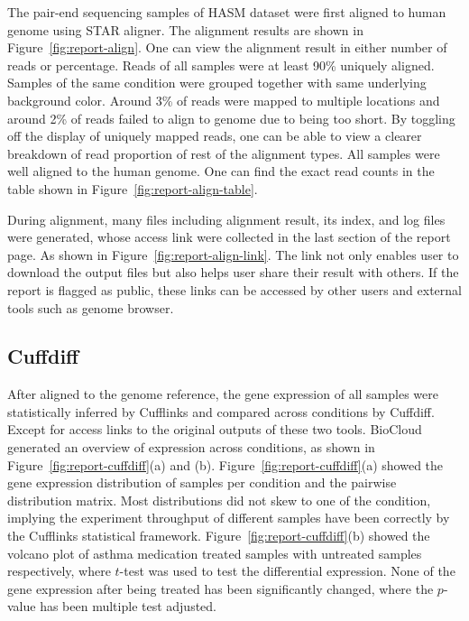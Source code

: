 

The pair-end sequencing samples of HASM dataset were first aligned to human
genome using STAR aligner. The alignment results are shown in
Figure~\ref{fig:report-align}. One can view the alignment result in either
number of reads or percentage. Reads of all samples were at least 90\% uniquely
aligned. Samples of the same condition were grouped together with same
underlying background color. Around 3\% of reads were mapped to multiple
locations and around 2\% of reads failed to align to genome due to being too
short. By toggling off the display of uniquely mapped reads, one can be able to
view a clearer breakdown of read proportion of rest of the alignment types.
All samples were well aligned to the human genome. One can find the exact read
counts in the table shown in Figure~\ref{fig:report-align-table}.



During alignment, many files including alignment result, its index, and log
files were generated,  whose access link were collected in the last section of
the report page. As shown in Figure~\ref{fig:report-align-link}. The link not
only enables user to download the output files but also helps user share their
result with others. If the report is flagged as public, these links can be
accessed by other users and external tools such as genome browser.




\subsection{Cuffdiff}



After aligned to the genome reference, the gene expression of all samples were
statistically inferred by Cufflinks and compared across conditions by Cuffdiff.
Except for access links to the original outputs of these two tools. BioCloud
generated an overview of expression across conditions, as shown in
Figure~\ref{fig:report-cuffdiff}(a) and (b).
Figure~\ref{fig:report-cuffdiff}(a) showed the gene expression distribution of
samples per condition and the pairwise distribution matrix. Most distributions
did not skew to one of the condition, implying the experiment throughput of
different samples have been correctly by the Cufflinks statistical framework.
Figure~\ref{fig:report-cuffdiff}(b) showed the volcano plot of asthma
medication treated samples with untreated samples respectively, where $t$-test
was used to test the differential expression. None of the
gene expression after being treated has been significantly changed, where the
$p$-value has been multiple test adjusted.

